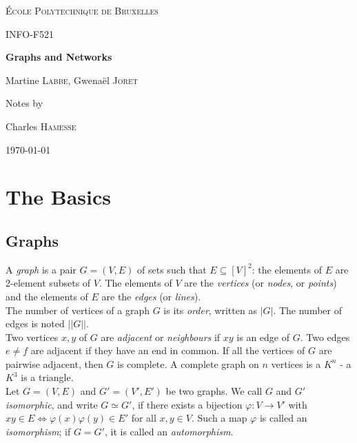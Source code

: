 \documentclass[11pt]{book}
\begin{document}
\begin{titlepage}
	\centering
	\vspace{1cm}
	{\scshape\LARGE École Polytechnique de Bruxelles \par}
	\vspace{3.5cm}
	{\scshape\Large INFO-F521\par}
	\vspace{.5cm}
	{\huge\bfseries Graphs and Networks\par}
	\vspace{2cm}
	{\Large Martine \textsc{Labbe}, Gwenaël \textsc{Joret}\par}
	\vfill
	Notes by \par
	Charles \textsc{Hamesse}

	\vfill

	{\large \today\par}
\end{titlepage}
\tableofcontents

\chapter{The Basics}
	\section{Graphs}
		A \textit{graph} is a pair $G = (V, E)$ of sets such that $E \subseteq [V]^2$: the elements of $E$ are 2-element subsets of $V$. The elements of $V$ are the \textit{vertices} (or \textit{nodes}, or \textit{points}) and the elements of $E$ are the \textit{edges} (or \textit{lines}). \\
		
		The number of vertices of a graph $G$ is its \textit{order}, written as $|G|$. The number of edges is noted $||G||$. \\
		
		Two vertices $x, y$ of $G$ are \textit{adjacent} or \textit{neighbours} if $x y$ is an edge of $G$. Two edges $e \neq f$ are adjacent if they have an end in common. If all the vertices of $G$ are pairwise adjacent, then $G$ is complete. A complete graph on $n$ vertices is a $K^n$ - a $K^3$ is a triangle.\\ 
		
		Let $G = (V, E)$ and $G' = (V', E')$ be two graphs. We call $G$ and $G'$ \textit{isomorphic}, and write $G \simeq G'$, if there exists a bijection $\varphi: V \rightarrow V'$ with $xy \in E \iff \varphi(x) \varphi(y) \in E'$ for all $x, y \in V$. Such a map $\varphi$ is called an \textit{isomorphism}; if $G = G'$, it is called an \textit{automorphism}. \\
		
\end{document}
